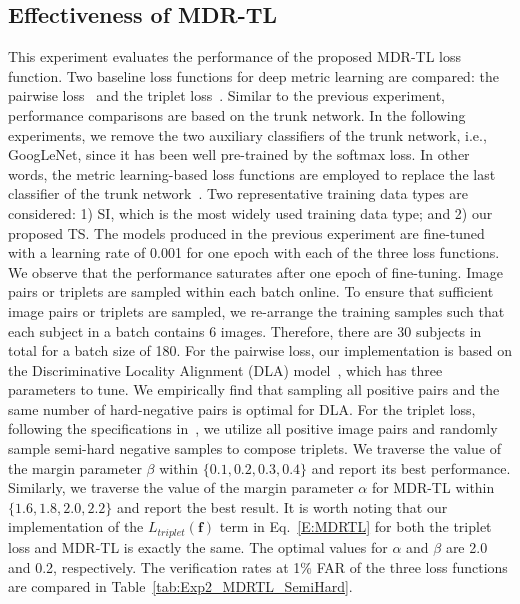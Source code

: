 \documentclass[10pt,journal,cspaper,compsoc]{IEEEtran}
\begin{document}
\subsection{Effectiveness of MDR-TL}
This experiment evaluates the performance of the proposed MDR-TL loss function.
Two baseline loss functions for deep metric learning are compared: the pairwise loss~\cite{zhang2009patch} and the triplet loss~\cite{schroff2015facenet}.
Similar to the previous experiment, performance comparisons are based on the trunk network.
In the following experiments, we remove the two auxiliary classifiers of the trunk network, i.e., GoogLeNet, since it has been well pre-trained by the softmax loss.
In other words, the metric learning-based loss functions are employed to replace the last classifier of the trunk network~\cite{szegedy2014going}.
Two representative training data types are considered:
1) SI, which is the most widely used training data type; and 2) our proposed TS.
The models produced in the previous experiment are fine-tuned with a learning rate of 0.001 for one epoch with each of the three loss functions.
We observe that the performance saturates after one epoch of fine-tuning.
Image pairs or triplets are sampled within each batch online. To ensure that sufficient image pairs or triplets are sampled,
we re-arrange the training samples such that each subject in a batch contains 6 images.
Therefore, there are 30 subjects in total for a batch size of 180.
For the pairwise loss, our implementation is based on the Discriminative Locality Alignment (DLA) model~\cite{zhang2009patch},
which has three parameters to tune.
We empirically find that sampling all positive pairs and the same number of hard-negative pairs is optimal for DLA.
For the triplet loss, following the specifications in~\cite{schroff2015facenet},
we utilize all positive image pairs and randomly sample semi-hard negative samples to compose triplets.
We traverse the value of the margin parameter $\beta$ within $\{0.1, 0.2, 0.3, 0.4\}$ and report its best performance.
Similarly, we traverse the value of the margin parameter $\alpha$ for MDR-TL within $\{1.6, 1.8, 2.0, 2.2\}$ and report the best result.
It is worth noting that our implementation of the $L_{triplet}(\mathbf{f})$ term in Eq.~\ref{E:MDRTL} for both the triplet loss and MDR-TL is exactly the same.
The optimal values for $\alpha$ and $\beta$ are 2.0 and 0.2, respectively.
The verification rates at 1\% FAR of the three loss functions are compared in Table~\ref{tab:Exp2_MDRTL_SemiHard}.
\end{document}

